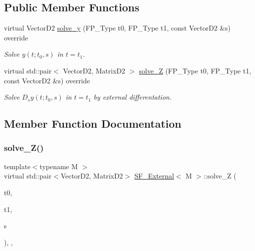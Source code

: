 \subsection*{Public Member Functions}
\begin{DoxyCompactItemize}
\item 
\mbox{\label{classSF__External_a4c59ab31f0bb2ab9663b5137655a6266}} 
virtual Vector\+D2 \hyperlink{classSF__External_a4c59ab31f0bb2ab9663b5137655a6266}{solve\+\_\+y} (F\+P\+\_\+\+Type t0, F\+P\+\_\+\+Type t1, const Vector\+D2 \&s) override
\begin{DoxyCompactList}\small\item\em Solve $y(t; t_0, s)$ in $t = t_1$. \end{DoxyCompactList}\item 
virtual std\+::pair$<$ Vector\+D2, Matrix\+D2 $>$ \hyperlink{classSF__External_a72c762001bc0a4bc43ac82aba45ad3ba}{solve\+\_\+Z} (F\+P\+\_\+\+Type t0, F\+P\+\_\+\+Type t1, const Vector\+D2 \&s) override
\begin{DoxyCompactList}\small\item\em Solve $D_s y(t; t_0, s)$ in $t = t_1$ by external differentation. \end{DoxyCompactList}\end{DoxyCompactItemize}


\subsection{Member Function Documentation}
\mbox{\label{classSF__External_a72c762001bc0a4bc43ac82aba45ad3ba}} 
\subsubsection{\texorpdfstring{solve\+\_\+\+Z()}{solve\_Z()}}
{\footnotesize\ttfamily template$<$typename M $>$ \\
virtual std\+::pair$<$Vector\+D2, Matrix\+D2$>$ \hyperlink{classSF__External}{S\+F\+\_\+\+External}$<$ M $>$\+::solve\+\_\+Z (\begin{DoxyParamCaption}\item[{F\+P\+\_\+\+Type}]{t0,  }\item[{F\+P\+\_\+\+Type}]{t1,  }\item[{const Vector\+D2 \&}]{s }\end{DoxyParamCaption})\hspace{0.3cm}{\ttfamily [inline]}, {\ttfamily [override]}, {\ttfamily [virtual]}}



